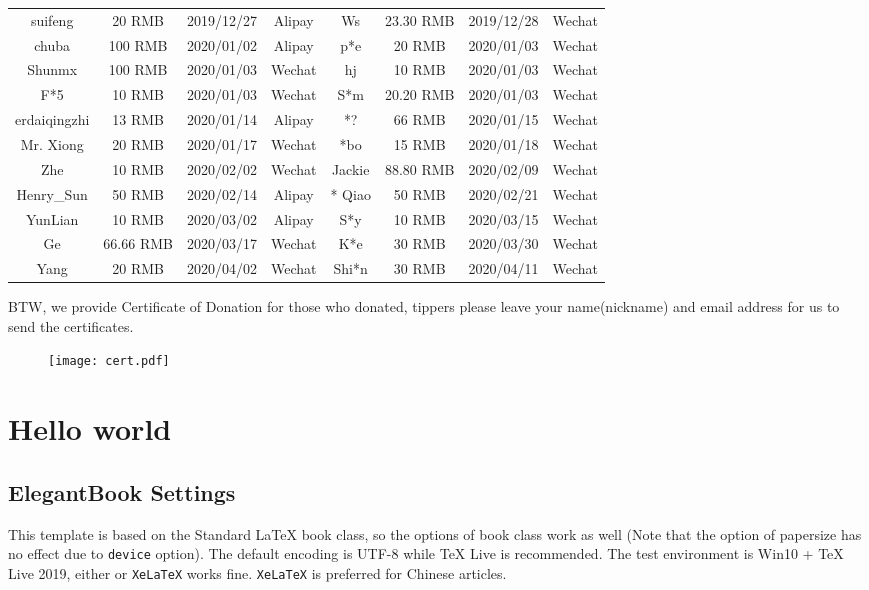 \documentclass[11pt,fancy,authoryear]{elegantbook}
\begin{document}
\begin{table}[!htb]
\begin{tabular}{*{4}{>{\scriptsize}c}|*{4}{>{\scriptsize}c}}
    suifeng   & 20 RMB & 2019/12/27 & Alipay   & Ws    & 23.30 RMB & 2019/12/28 & Wechat \\
    chuba    & 100 RMB  & 2020/01/02 & Alipay   & p*e   & 20 RMB & 2020/01/03 & Wechat \\
    Shunmx & 100 RMB & 2020/01/03 & Wechat    & hj    & 10 RMB & 2020/01/03 & Wechat \\
    F*5   & 10 RMB & 2020/01/03 & Wechat    & S*m   & 20.20 RMB & 2020/01/03 & Wechat \\
    erdaiqingzhi  & 13 RMB & 2020/01/14 & Alipay   & *?    & 66 RMB & 2020/01/15 & Wechat \\
    Mr. Xiong & 20 RMB & 2020/01/17 & Wechat    & *bo    & 15 RMB & 2020/01/18 & Wechat \\
    *Zhe    & 10 RMB & 2020/02/02 & Wechat    &  Jackie &  88.80 RMB  &  2020/02/09 & Wechat \\
    Henry\_Sun & 50 RMB & 2020/02/14 & Alipay & * Qiao  & 50 RMB & 2020/02/21 & Wechat \\
    YunLian & 10 RMB & 2020/03/02 & Alipay & S*y  &  10 RMB  &  2020/03/15 & Wechat \\
    * Ge  & 66.66 RMB & 2020/03/17 & Wechat    &   K*e & 30 RMB & 2020/03/30 & Wechat\\
    * Yang  &  20 RMB  &  2020/04/02 & Wechat & Shi*n  & 30 RMB & 2020/04/11 & Wechat \\
    \bottomrule
  \end{tabular}%
  \label{tab:donation}%
\end{table}%

BTW, we provide Certificate of Donation for those who donated, tippers please leave your name(nickname) and email address for us to send the certificates.

\begin{figure}[!htb]
  \centering
  \texttt{[image: cert.pdf]}
\end{figure}

\part{Hello world}
\chapter{ElegantBook Settings}

This template is based on the Standard \LaTeX{} book class, so the options of book class work as well (Note that the option of papersize has no effect due to \lstinline{device} option). The default encoding is UTF-8 while \TeX{} Live is recommended. The test environment is Win10 + \TeX{} Live 2019, either  or \lstinline{XeLaTeX} works fine. \lstinline{XeLaTeX} is preferred for Chinese articles.
\end{document}

